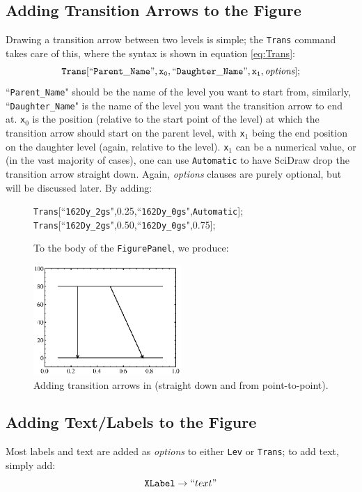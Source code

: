 \documentclass[portrait,10pt]{article}
\begin{document}
\subsection{Adding Transition Arrows to the Figure}
Drawing a transition arrow between two levels is simple; the {\tt Trans} command takes care of this, where the syntax is shown in equation \ref{eq:Trans}: 
\begin{equation} \label{eq:Trans}
{\tt Trans[``Parent\_Name",x_0,``Daughter\_Name",x_1,\textit{options}];}
\end{equation}
``{\tt Parent\_Name}" should be the name of the level you want to start from, similarly, ``{\tt Daughter\_Name}" is the name of the level you want the transition arrow to end at. {\tt x$_0$} is the position (relative to the start point of the level) at which the transition arrow should start on the parent level, with {\tt x$_1$} being the end position on the daughter level (again, relative to the level). {\tt x$_1$} can be a numerical value, or (in the vast majority of cases), one can use {\tt Automatic} to have SciDraw drop the transition arrow straight down. Again, \textit{options} clauses are purely optional, but will be discussed later. By adding:

\begin{figure}[h]
\begin{center}
   {\tt Trans}[``{\tt 162Dy\_2gs}",0.25,``{\tt 162Dy\_0gs}",{\tt Automatic}];\\
   {\tt Trans}[``{\tt 162Dy\_2gs}",0.50,``{\tt 162Dy\_0gs}",0.75];\\
\end{center}
To the body of the {\tt FigurePanel}, we produce:
\begin{center}
\includegraphics[width=0.5\textwidth]{Trans.eps}
\end{center}
\caption{Adding transition arrows in (straight down and from point-to-point). \label{text:Trans}}
\end{figure}

\subsection{Adding Text/Labels to the Figure}
Most labels and text are added as \textit{options} to either {\tt Lev} or {\tt Trans}; to add text, simply add:
\begin{equation}\label{eq:XLabel}
{\tt XLabel}\rightarrow``text"
\end{equation}
\end{document}
